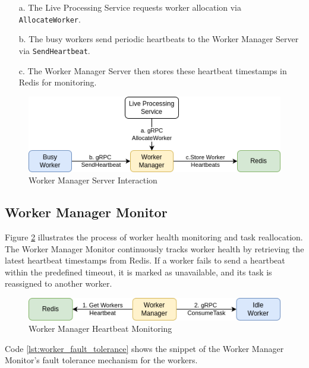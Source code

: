 \begin{enumerate}
  \item [a.] The Live Processing Service requests worker allocation via \texttt{AllocateWorker}.
  \item [b.] The busy workers send periodic heartbeats to the Worker Manager Server via \texttt{SendHeartbeat}.
  \item [c.] The Worker Manager Server then stores these heartbeat timestamps in Redis for monitoring.
\end{enumerate}

\begin{figure}[H]
  \centering
  \includegraphics[width=.8\textwidth]{figures/worker_manager_server.drawio.png}
  \caption{Worker Manager Server Interaction}
  \label{fig:worker_manager_server}
\end{figure}


\subsection{Worker Manager Monitor} \label{subsection:worker_manager_monitor}
Figure \ref{fig:worker_manager_monitor} illustrates the process of worker health monitoring and task reallocation. The Worker Manager Monitor continuously tracks worker health by retrieving the latest heartbeat timestamps from Redis. If a worker fails to send a heartbeat within the predefined timeout, it is marked as unavailable, and its task is reassigned to another worker.

\begin{figure}[ht]
  \centering
  \includegraphics[width=.8\textwidth]{figures/worker_manager_heartbeat.drawio.png}
  \caption{Worker Manager Heartbeat Monitoring}
  \label{fig:worker_manager_monitor}
\end{figure}

Code \ref{lst:worker_fault_tolerance} shows the snippet of the Worker Manager Monitor's fault tolerance mechanism for the workers.

